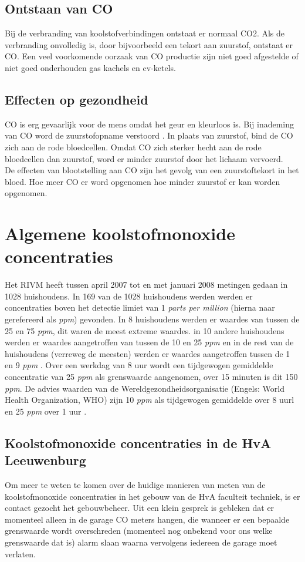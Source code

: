 \documentclass[a4paper, 11pt]{article} %
\begin{document}
\subsection{Ontstaan van CO}
Bij de verbranding van koolstofverbindingen ontstaat er normaal CO2. Als de verbranding onvolledig is, door bijvoorbeeld een tekort aan zuurstof, ontstaat er CO. Een veel voorkomende oorzaak van CO productie zijn niet goed afgestelde of niet goed onderhouden gas kachels en cv-ketels.

\subsection{Effecten op gezondheid}
CO is erg gevaarlijk voor de mens omdat het geur en kleurloos is. Bij inademing van CO word de zuurstofopname verstoord \cite{Effecten Koolmonoxide}. In plaats van zuurstof, bind de CO zich aan de rode bloedcellen. Omdat CO zich sterker hecht aan de rode bloedcellen dan zuurstof, word er minder zuurstof door het lichaam vervoerd. 
\\
De effecten van blootstelling aan CO zijn het gevolg van een zuurstoftekort in het bloed. Hoe meer CO er word opgenomen hoe minder zuurstof er kan worden opgenomen. 

\section{Algemene koolstofmonoxide concentraties}
Het RIVM heeft tussen april 2007 tot en met januari 2008 metingen gedaan in 1028 huishoudens. In 169 van de 1028 huishoudens werden werden er concentraties boven het detectie limiet van 1 \textit{parts per million} (hierna naar gerefereerd als \textit{ppm}) gevonden. In 8 huishoudens werden er waardes van tussen de 25 en 75 \textit{ppm}, dit waren de meest extreme waardes. in 10 andere huishoudens werden er waardes aangetroffen van tussen de 10 en 25 \textit{ppm} en in de rest van de huishoudens (verreweg de meesten) werden er waardes aangetroffen tussen de 1 en 9 \textit{ppm} \cite{RIVM huurwoningen}. Over een werkdag van 8 uur wordt een tijdgewogen gemiddelde concentratie van 25 \textit{ppm} als grenswaarde aangenomen, over 15 minuten is dit 150 \textit{ppm}. De advies waarden van de Wereldgezondheidsorganisatie (Engels: World Health Organization, WHO) zijn 10 \textit{ppm} als tijdgewogen gemiddelde over 8 uurl en 25 \textit{ppm} over 1 uur \cite{Blootstelling aan CO}.
\subsection{Koolstofmonoxide concentraties in de HvA Leeuwenburg}
Om meer te weten te komen over de huidige manieren van meten van de koolstofmonoxide concentraties in het gebouw van de HvA faculteit techniek, is er contact gezocht het gebouwbeheer. Uit een klein gesprek is gebleken dat er momenteel alleen in de garage CO meters hangen, die wanneer er een bepaalde grenswaarde wordt overschreden (momenteel nog onbekend voor ons welke grenswaarde dat is) alarm slaan waarna vervolgens iedereen de garage moet verlaten.
\end{document}
